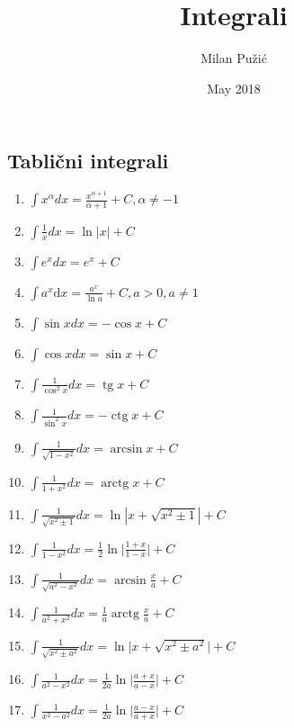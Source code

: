\documentclass{article}
\title{Integrali}
\author{Milan Pužić}
\date{May 2018}
\DeclareMathOperator{\tg}{tg}
\DeclareMathOperator{\ctg}{ctg}
\DeclareMathOperator{\arctg}{arctg}
\begin{document}
\subsection{Tablični integrali}

\begin{minipage}[t]{0.5\textwidth}
\begin{enumerate}
	\item$ \displaystyle \int x ^ { \alpha } d x = \frac { x ^ { \alpha + 1} } { \alpha + 1} + C ,\alpha \neq - 1 $
	\item $\displaystyle \int \frac { 1 } { x } d x = \ln | x | + C $
	\item $\displaystyle \int e ^ { x } d x = e ^ { x } + C $
	\item $\displaystyle \int a ^ { x } \text{d} x = \frac { a ^ { x } } { \ln a } + C ,a > 0,a \neq 1 $
	\item $\displaystyle \int \sin x d x = - \cos x + C $
	\item $\displaystyle \int \cos x d x = \sin x + C$
	\item $\displaystyle \int \frac { 1 } { \cos ^ { 2} x } d x = \tg x + C$
	\item $\displaystyle \int \frac { 1 } { \sin ^ { 2} x } d x = - \ctg x + C$
	\item $\displaystyle \int \frac { 1} { \sqrt { 1- x ^ { 2} } } d x = \arcsin x + C$
\end{enumerate}
\end{minipage}
\begin{minipage}[t]{0.5\textwidth}
\begin{enumerate}
\setcounter{enumi}{9}
	\item $\displaystyle \int \frac { 1} { 1+ x ^ { 2} } d x = \arctg x + C$
	\item $\displaystyle \int \frac { 1} { \sqrt { x ^ { 2} \pm 1} } d x = \ln | x + \sqrt { x ^ { 2} \pm 1} | + C$
	\item $\displaystyle \int \frac { 1} { 1- x ^ { 2} } d x = \frac { 1} { 2} \ln \bigg| \frac { 1+ x } { 1- x } \bigg| + C$
	\item [\labelname{9'.}] $\displaystyle \int \frac { 1} { \sqrt { a ^ { 2} - x ^ { 2} } } d x = \arcsin \frac { x } { a } + C$
	\item [\labelname{10'.}] $\displaystyle \int \frac { 1} { a ^ { 2} + x ^ { 2} } d x = \frac { 1} { a } \arctg \frac { x } { a } + C$
	\item [\labelname{11'.}] $\displaystyle \int \frac { 1} { \sqrt { x ^ { 2} \pm a ^ { 2} } } d x = \ln \big| x + \sqrt { x ^ { 2} \pm a ^ { 2} } \big| + C$
	\item [\labelname{12'.}] $\displaystyle \int \frac { 1} { a ^ { 2} - x ^ { 2} } d x = \frac { 1} { 2a } \ln \bigg| \frac { a + x } { a - x } \bigg| + C$
	\item [\labelname{12''.}] $\displaystyle \int \frac { 1} { x ^ { 2} - a ^ { 2} } d x = \frac { 1} { 2a } \ln \bigg| \frac { a - x } { a + x } \bigg| + C$
\end{enumerate}
\end{minipage}
\end{document}
